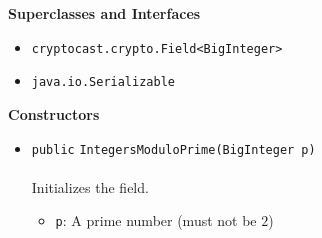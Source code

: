 \textbf{\sffamily Superclasses and Interfaces}
\begin{itemize}
\item \lstinline|cryptocast.crypto.Field<BigInteger>|
\item \lstinline|java.io.Serializable|
\end{itemize}


\textbf{\sffamily Constructors}
\begin{itemize}
\item \lstinline|public| \lstinline|IntegersModuloPrime|\lstinline|(BigInteger p)|\\ \\[-0.6em]
Initializes the field.
\begin{itemize}
\item \lstinline|p|: A prime number (must not be $2$)
\end{itemize}



\end{itemize}


